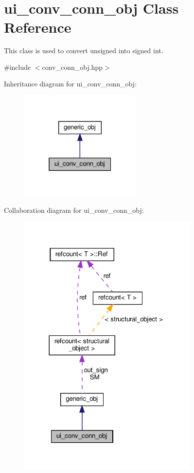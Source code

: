 \hypertarget{classui__conv__conn__obj}{}\section{ui\+\_\+conv\+\_\+conn\+\_\+obj Class Reference}
\label{classui__conv__conn__obj}


This class is used to convert unsigned into signed int.  




{\ttfamily \#include $<$conv\+\_\+conn\+\_\+obj.\+hpp$>$}



Inheritance diagram for ui\+\_\+conv\+\_\+conn\+\_\+obj\+:
\nopagebreak
\begin{figure}[H]
\begin{center}
\leavevmode
\includegraphics[width=175pt]{d3/db9/classui__conv__conn__obj__inherit__graph}
\end{center}
\end{figure}


Collaboration diagram for ui\+\_\+conv\+\_\+conn\+\_\+obj\+:
\nopagebreak
\begin{figure}[H]
\begin{center}
\leavevmode
\includegraphics[width=257pt]{d5/dcb/classui__conv__conn__obj__coll__graph}
\end{center}
\end{figure}
